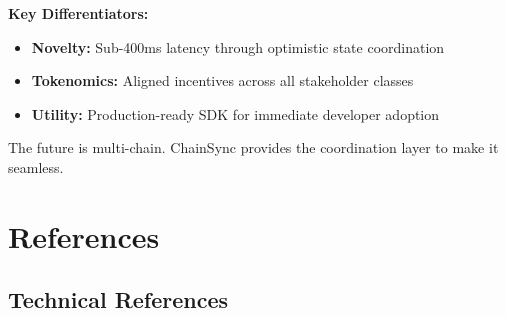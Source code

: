 \documentclass[12pt,a4paper]{article}
\begin{document}
\textbf{Key Differentiators:}
\begin{itemize}
    \item \textbf{Novelty:} Sub-400ms latency through optimistic state coordination
    \item \textbf{Tokenomics:} Aligned incentives across all stakeholder classes
    \item \textbf{Utility:} Production-ready SDK for immediate developer adoption
\end{itemize}

The future is multi-chain. ChainSync provides the coordination layer to make it seamless.

\section{References}

\subsection{Technical References}
\end{document}
